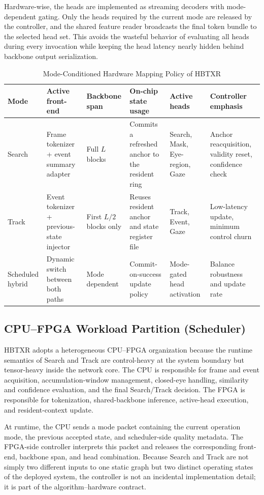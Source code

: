 \documentclass[journal]{IEEEtran}
\begin{document}
Hardware-wise, the heads are implemented as streaming decoders with mode-dependent gating. Only the heads required by the current mode are released by the controller, and the shared feature reader broadcasts the final token bundle to the selected head set. This avoids the wasteful behavior of evaluating all heads during every invocation while keeping the head latency nearly hidden behind backbone output serialization.

\begin{table}[t]
\caption{Mode-Conditioned Hardware Mapping Policy of HBTXR}
\label{tab:mapping}
\centering
\small
\begin{tabularx}{\textwidth}{@{}L{0.10\textwidth}L{0.20\textwidth}L{0.15\textwidth}L{0.18\textwidth}L{0.16\textwidth}Y@{}}
\toprule
Mode & Active front-end & Backbone span & On-chip state usage & Active heads & Controller emphasis \\
\midrule
Search & Frame tokenizer + event summary adapter & Full $L$ blocks & Commits a refreshed anchor to the resident ring & Search, Mask, Eye-region, Gaze & Anchor reacquisition, validity reset, confidence check \\
Track & Event tokenizer + previous-state injector & First $L/2$ blocks only & Reuses resident anchor and state register file & Track, Event, Gaze & Low-latency update, minimum control churn \\
Scheduled hybrid & Dynamic switch between both paths & Mode dependent & Commit-on-success update policy & Mode-gated head activation & Balance robustness and update rate \\
\bottomrule
\end{tabularx}
\end{table}

\subsection{CPU--FPGA Workload Partition (Scheduler)}
HBTXR adopts a heterogeneous CPU--FPGA organization because the runtime semantics of Search and Track are control-heavy at the system boundary but tensor-heavy inside the network core. The CPU is responsible for frame and event acquisition, accumulation-window management, closed-eye handling, similarity and confidence evaluation, and the final Search/Track decision. The FPGA is responsible for tokenization, shared-backbone inference, active-head execution, and resident-context update.

At runtime, the CPU sends a mode packet containing the current operation mode, the previous accepted state, and scheduler-side quality metadata. The FPGA-side controller interprets this packet and releases the corresponding front-end, backbone span, and head combination. Because Search and Track are not simply two different inputs to one static graph but two distinct operating states of the deployed system, the controller is not an incidental implementation detail; it is part of the algorithm--hardware contract.
\end{document}
